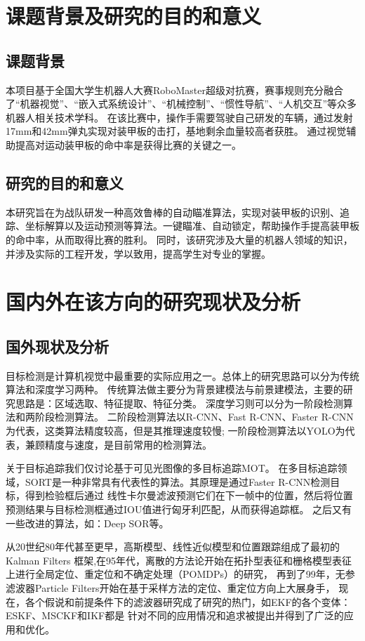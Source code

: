 \section{课题背景及研究的目的和意义}
\subsection{课题背景}
本项目基于全国大学生机器人大赛RoboMaster超级对抗赛，赛事规则充分融合了“机器视觉”、“嵌入式系统设计”、“机械控制”、“惯性导航”、“人机交互”等众多机器人相关技术学科。
在该比赛中，操作手需要驾驶自己研发的车辆，通过发射17mm和42mm弹丸实现对装甲板的击打，基地剩余血量较高者获胜。
通过视觉辅助提高对运动装甲板的命中率是获得比赛的关键之一。

\subsection{研究的目的和意义}
本研究旨在为战队研发一种高效鲁棒的自动瞄准算法，实现对装甲板的识别、追踪、坐标解算以及运动预测等算法。一键瞄准、自动锁定，帮助操作手提高装甲板的命中率，从而取得比赛的胜利。
同时，该研究涉及大量的机器人领域的知识，并涉及实际的工程开发，学以致用，提高学生对专业的掌握。
\section{国内外在该方向的研究现状及分析}
\subsection{国外现状及分析}
目标检测是计算机视觉中最重要的实际应用之一。总体上的研究思路可以分为传统算法和深度学习两种。
传统算法做主要分为背景建模法与前景建模法，主要的研究思路是：区域选取、特征提取、特征分类。
深度学习则可以分为一阶段检测算法和两阶段检测算法。
二阶段检测算法以R-CNN、Fast R-CNN、Faster R-CNN为代表，这类算法精度较高，但是其推理速度较慢;
一阶段检测算法以YOLO为代表，兼顾精度与速度，是目前常用的检测算法。 \par

关于目标追踪我们仅讨论基于可见光图像的多目标追踪MOT。
在多目标追踪领域，SORT是一种非常具有代表性的算法。其原理是通过Faster R-CNN检测目标，得到检验框后通过
线性卡尔曼滤波预测它们在下一帧中的位置，然后将位置预测结果与目标检测框通过IOU值进行匈牙利匹配，从而获得追踪框。
之后又有一些改进的算法，如：Deep SOR等。

从20世纪80年代甚至更早，高斯模型、线性近似模型和位置跟踪组成了最初的Kalman Filters
框架,在95年代，离散的方法论开始在拓扑型表征和栅格模型表征上进行全局定位、重定位和不确定处理（POMDPs）的研究，
再到了99年，无参滤波器Particle Filters开始在基于采样方法的定位、重定位方向上大展身手，
现在，各个假说和前提条件下的滤波器研究成了研究的热门，如EKF的各个变体：ESKF、MSCKF和IKF都是
针对不同的应用情况和追求被提出并得到了广泛的应用和优化。

